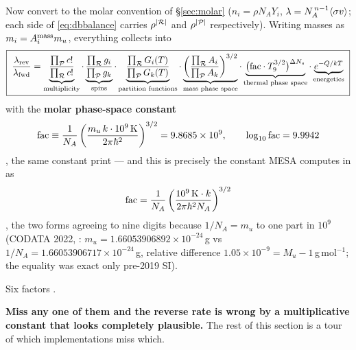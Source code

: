 Now convert to the molar convention of \S\ref{sec:molar}
($n_i = \rho N_A Y_i$, $\lambda = N_A^{\,n-1}\langle\sigma v\rangle$; each side of
\eqref{eq:dbbalance} carries $\rho^{|\mathcal{R}|}$ and $\rho^{|\mathcal{P}|}$
respectively). Writing masses as $m_i = A_i^{\rm mass} m_u$, everything collects
into
%
\begin{equation}
\boxed{\;
\frac{\lambda_{\rm rev}}{\lambda_{\rm fwd}}
=
\underbrace{\frac{\prod_{\mathcal{P}} c!}{\prod_{\mathcal{R}} c!}}_{\text{multiplicity}}
\cdot
\underbrace{\frac{\prod_{\mathcal{R}} g_i}{\prod_{\mathcal{P}} g_k}}_{\text{spins}}
\cdot
\underbrace{\frac{\prod_{\mathcal{R}} G_i(T)}{\prod_{\mathcal{P}} G_k(T)}}_{\text{partition functions}}
\cdot
\underbrace{\left(\frac{\prod_{\mathcal{R}} A_i}{\prod_{\mathcal{P}} A_k}\right)^{3/2}}_{\text{mass phase space}}
\cdot
\underbrace{\bigl(\mathrm{fac}\cdot T_{9}^{3/2}\bigr)^{\Delta N_{s}}}_{\text{thermal phase space}}
\cdot
\underbrace{e^{-Q/kT}}_{\text{energetics}}
\;}
\label{eq:dbratio}
\end{equation}
%
with the \textbf{molar phase-space constant}
%
\begin{equation}
\mathrm{fac} \equiv \frac{1}{N_A}
\left(\frac{m_u\,k\cdot 10^9\,\mathrm{K}}{2\pi\hbar^2}\right)^{3/2}
= 9.8685\times10^{9},
\qquad \log_{10}\mathrm{fac} = 9.9942
\label{eq:fac}
\end{equation}
%
\derivedhere{}, the same constant \citet{rauscher2000} print --- and this is
precisely the constant MESA computes in
 as
%
\begin{equation*}
\mathrm{fac} = \frac{1}{N_A}\left(\frac{10^9\,\mathrm{K}\cdot k}{2\pi\hbar^2 N_A}\right)^{3/2}
\end{equation*}
%
, the two forms agreeing to nine digits because
$1/N_A = m_u$ to one part in $10^9$ (CODATA 2022, \citealp{codata}:
$m_u = 1.66053906892\times10^{-24}$\,g vs
$1/N_A = 1.66053906717\times10^{-24}$\,g, relative difference
$1.05\times10^{-9} = M_u - 1$\,g\,mol$^{-1}$; the equality was exact only
pre-2019 SI).

Six factors \citep{rauscher2000,smith2023}.

\begin{warn}
\textbf{Miss any one of them and the reverse rate is wrong by a multiplicative
constant that looks completely plausible.} The rest of this section is a tour of
which implementations miss which.
\end{warn}

